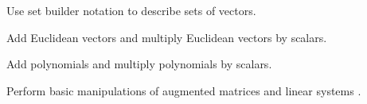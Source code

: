 \begin{readinessAssuranceOutcomes}
\item Use set builder notation to describe sets of vectors.
\item Add Euclidean vectors and multiply Euclidean vectors by scalars.
\item Add polynomials and multiply polynomials by scalars.
\item Perform basic manipulations of augmented matrices and linear
systems .
\end{readinessAssuranceOutcomes}
